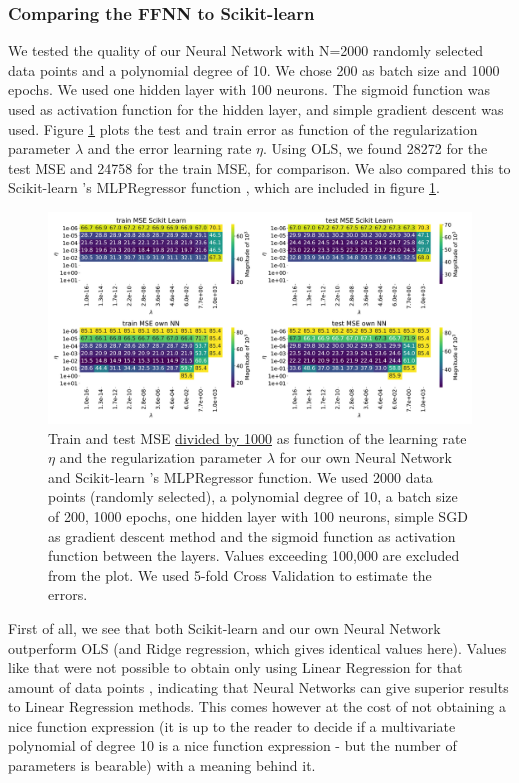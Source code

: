 \documentclass[11pt,a4paper,titlepage]{article}
\begin{document}
\subsubsection{Comparing the FFNN to Scikit-learn}
We tested the quality of our Neural Network with N=2000 randomly selected data points and a polynomial degree of 10. We chose 200 as batch size and 1000 epochs. We used one hidden layer with 100 neurons. The sigmoid function was used as activation function for the hidden layer, and simple gradient descent was used. Figure \ref{fig:ScikitLearn_1} plots the test and train error as function of the regularization parameter $\lambda$ and the error learning rate $\eta$. Using OLS, we found 28272 for the test MSE and 24758 for the train MSE, for comparison. We also compared this to Scikit-learn 's MLPRegressor function \citep{scikit-learn}, which are included in figure \ref{fig:ScikitLearn_1}.
\begin{figure}[H]
\centering
\includegraphics[width=1.05\textwidth]{scikit_own_1b1_logisticsgd200010.pdf}
\caption[Scikit-learn  and own FFNN with 1 layer]{Train and test MSE \underline{divided by 1000} as function of the learning rate $\eta$ and the regularization parameter $\lambda$ for our own Neural Network and Scikit-learn 's MLPRegressor function. We used 2000 data points (randomly selected), a polynomial degree of 10, a batch size of 200, 1000 epochs, one hidden layer with 100 neurons, simple SGD as gradient descent method and the sigmoid function as activation function between the layers. Values exceeding 100,000 are excluded from the plot. We used 5-fold Cross Validation to estimate the errors.} \label{fig:ScikitLearn_1}
\end{figure}
First of all, we see that both Scikit-learn and our own Neural Network outperform OLS (and Ridge regression, which gives identical values here). Values like that were not possible to obtain only using Linear Regression for that amount of data points \citep{Project1}, indicating that Neural Networks can give superior results to Linear Regression methods. This comes however at the cost of not obtaining a nice function expression (it is up to the reader to decide if a multivariate polynomial of degree 10 is a nice function expression - but the number of parameters is bearable) with a meaning behind it. \\
\end{document}
